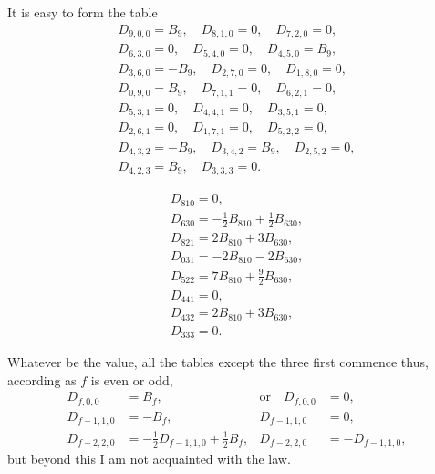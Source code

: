 \documentclass[12pt,a4paper]{article}
\begin{document}
It is easy to form the table
\begin{gather*}
D_{9,0,0} = B_9,\quad D_{8,1,0} = 0,\quad D_{7,2,0} = 0,\\
D_{6,3,0} = 0,\quad D_{5,4,0} = 0,\quad D_{4,5,0} = B_9,\\
D_{3,6,0} = -B_9,\quad D_{2,7,0} = 0,\quad D_{1,8,0} = 0,\\
D_{0,9,0} = B_9,\quad D_{7,1,1} = 0,\quad D_{6,2,1} = 0,\\
D_{5,3,1} = 0,\quad D_{4,4,1} = 0,\quad D_{3,5,1} = 0,\\
D_{2,6,1} = 0,\quad D_{1,7,1} = 0,\quad D_{5,2,2} = 0,\\
D_{4,3,2} = -B_9,\quad D_{3,4,2} = B_9,\quad D_{2,5,2} = 0,\\
D_{4,2,3} = B_9,\quad D_{3,3,3} = 0.
\end{gather*}

\newpage
\setcounter{page}{106}
\begin{gather*}
D_{810} = 0,\\
D_{630} = -\tfrac{1}{2} B_{810} + \tfrac{1}{2} B_{630},\\
D_{821} = 2B_{810} + 3B_{630},\\
D_{031} = -2B_{810} - 2B_{630},\\
D_{522} = 7B_{810} + \tfrac{9}{2} B_{630},\\
D_{441} = 0,\\
D_{432} = 2B_{810} + 3B_{630},\\
D_{333} = 0.
\end{gather*}

Whatever be the value, all the tables except the three first commence thus, according
as $f$ is even or odd,
\begin{align*}
D_{f,0,0} &= B_f, & \text{or}\quad D_{f,0,0} &= 0,\\
D_{f-1,1,0} &= -B_f, & D_{f-1,1,0} &= 0,\\
D_{f-2,2,0} &= -\tfrac{1}{2}D_{f-1,1,0} + \tfrac{1}{2}B_f, & D_{f-2,2,0} &= -D_{f-1,1,0},
\end{align*}
but beyond this I am not acquainted with the law.
\end{document}
